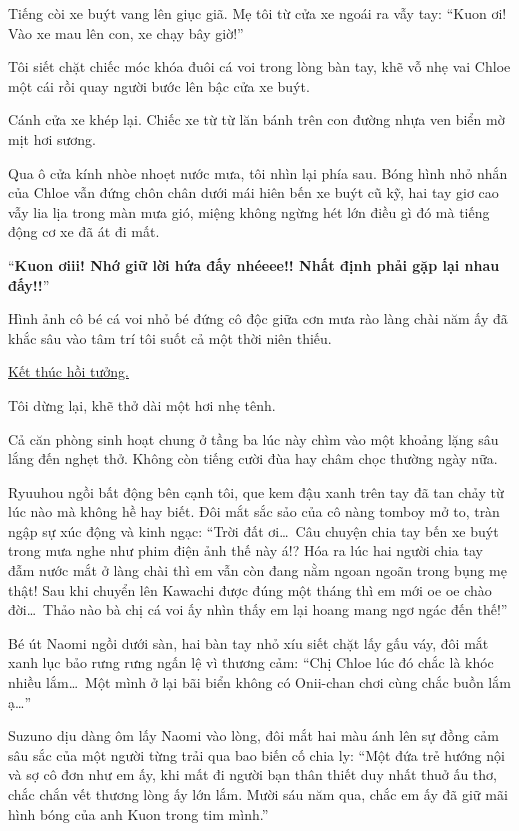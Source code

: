 \documentclass[../main.tex]{subfiles}
\begin{document}
Tiếng còi xe buýt vang lên giục giã. Mẹ tôi từ cửa xe ngoái ra vẫy tay: ``Kuon ơi! Vào xe mau lên con, xe chạy bây giờ!''

Tôi siết chặt chiếc móc khóa đuôi cá voi trong lòng bàn tay, khẽ vỗ nhẹ vai Chloe một cái rồi quay người bước lên bậc cửa xe buýt.

Cánh cửa xe khép lại. Chiếc xe từ từ lăn bánh trên con đường nhựa ven biển mờ mịt hơi sương.

Qua ô cửa kính nhòe nhoẹt nước mưa, tôi nhìn lại phía sau. Bóng hình nhỏ nhắn của Chloe vẫn đứng chôn chân dưới mái hiên bến xe buýt cũ kỹ, hai tay giơ cao vẫy lia lịa trong màn mưa gió, miệng không ngừng hét lớn điều gì đó mà tiếng động cơ xe đã át đi mất.

``\textbf{Kuon ơiii! Nhớ giữ lời hứa đấy nhéeee!! Nhất định phải gặp lại nhau đấy!!}''

Hình ảnh cô bé cá voi nhỏ bé đứng cô độc giữa cơn mưa rào làng chài năm ấy đã khắc sâu vào tâm trí tôi suốt cả một thời niên thiếu.

\begin{center}
    \uline{Kết thúc hồi tưởng.}
\end{center}

Tôi dừng lại, khẽ thở dài một hơi nhẹ tênh.

Cả căn phòng sinh hoạt chung ở tầng ba lúc này chìm vào một khoảng lặng sâu lắng đến nghẹt thở. Không còn tiếng cười đùa hay châm chọc thường ngày nữa.

Ryuuhou ngồi bất động bên cạnh tôi, que kem đậu xanh trên tay đã tan chảy từ lúc nào mà không hề hay biết. Đôi mắt sắc sảo của cô nàng tomboy mở to, tràn ngập sự xúc động và kinh ngạc: ``Trời đất ơi\dots\ Câu chuyện chia tay bến xe buýt trong mưa nghe như phim điện ảnh thế này á!? Hóa ra lúc hai người chia tay đẫm nước mắt ở làng chài thì em vẫn còn đang nằm ngoan ngoãn trong bụng mẹ thật! Sau khi chuyển lên Kawachi được đúng một tháng thì em mới oe oe chào đời\dots\ Thảo nào bà chị cá voi ấy nhìn thấy em lại hoang mang ngơ ngác đến thế!''

Bé út Naomi ngồi dưới sàn, hai bàn tay nhỏ xíu siết chặt lấy gấu váy, đôi mắt xanh lục bảo rưng rưng ngấn lệ vì thương cảm: ``Chị Chloe lúc đó chắc là khóc nhiều lắm\dots\ Một mình ở lại bãi biển không có Onii-chan chơi cùng chắc buồn lắm ạ\dots''

Suzuno dịu dàng ôm lấy Naomi vào lòng, đôi mắt hai màu ánh lên sự đồng cảm sâu sắc của một người từng trải qua bao biến cố chia ly: ``Một đứa trẻ hướng nội và sợ cô đơn như em ấy, khi mất đi người bạn thân thiết duy nhất thuở ấu thơ, chắc chắn vết thương lòng ấy lớn lắm. Mười sáu năm qua, chắc em ấy đã giữ mãi hình bóng của anh Kuon trong tim mình.''
\end{document}

